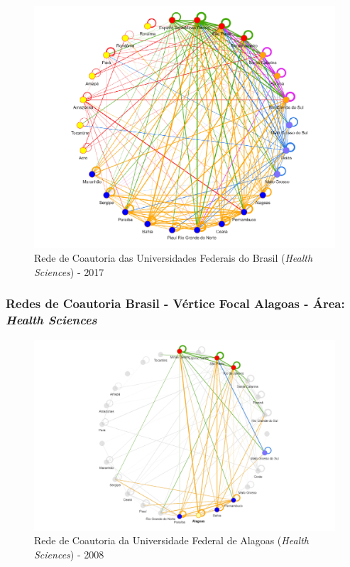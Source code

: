 \begin{figure}[H]
	\centering
	\includegraphics[width=\linewidth]{Imagens/rede-2017.pdf}
	\caption{Rede de Coautoria das Universidades Federais do Brasil (\textit{Health Sciences}) - 2017}
	\label{Rede de Coautoria - UF BR 2017}
\end{figure}

\subsubsection{Redes de Coautoria Brasil - Vértice Focal Alagoas - Área: \textit{Health Sciences}}

\begin{figure}[H]
	\centering
	\includegraphics[width=\linewidth]{Imagens/rede-al-2008.pdf}
	\caption{Rede de Coautoria da Universidade Federal de Alagoas (\textit{Health Sciences}) - 2008}
	\label{Rede de Coautoria - UF AL 2008}
\end{figure}

